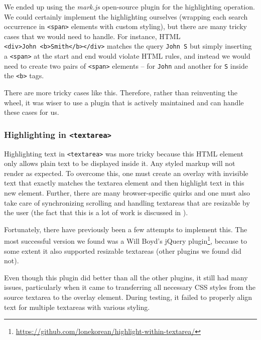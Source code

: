 \documentclass[bsc,frontabs,twoside,singlespacing,parskip,deptreport]{infthesis}
\begin{document}
We ended up using the \textit{mark.js} \cite{A23} open-source plugin for the highlighting operation. We could certainly implement the highlighting ourselves (wrapping each search occurrence in \texttt{\textless{}span\textgreater{}} elements with custom styling),
but there are many tricky cases that we would need to handle. For
instance, HTML \texttt{\textless{}div\textgreater{}John\ \textless{}b\textgreater{}Smith\textless{}/b\textgreater{}\textless{}/div\textgreater{}} matches the query \texttt{John\ S} but simply inserting a \texttt{\textless{}span\textgreater{}} at the start and end would violate HTML rules, and instead we would need to create two pairs of \texttt{\textless{}span\textgreater{}} elements -- for \texttt{John} and another for \texttt{S} inside the \texttt{\textless{}b\textgreater{}} tags.

There are more tricky cases like this. Therefore, rather than
reinventing the wheel, it was wiser to use a plugin that is actively
maintained and can handle these cases for us.

\subsubsection{Highlighting in \texttt{\textless{}textarea\textgreater{}}}
Highlighting text in \texttt{\textless{}textarea\textgreater{}} was more tricky because this HTML element only allows plain text to be displayed inside it. Any styled markup will not render as expected. To overcome this, one must create an overlay with invisible text that exactly matches the textarea element and then highlight text in this new element. Further, there are many browser-specific quirks and one must also take care of synchronizing scrolling and handling textareas that are resizable by the user (the fact that this is a lot of work is discussed in \cite{A24}).

Fortunately, there have previously been a few attempts to implement this. The most successful version we found was a Will Boyd's jQuery plugin\footnote{\url{https://github.com/lonekorean/highlight-within-textarea/}}, because to some extent it also supported resizable textareas (other plugins we found did not).

Even though this plugin did better than all the other plugins, it still had many issues, particularly when it came to transferring all necessary CSS styles from the source textarea to the overlay element. During testing, it failed to properly align text for multiple textareas with various styling.
\end{document}
